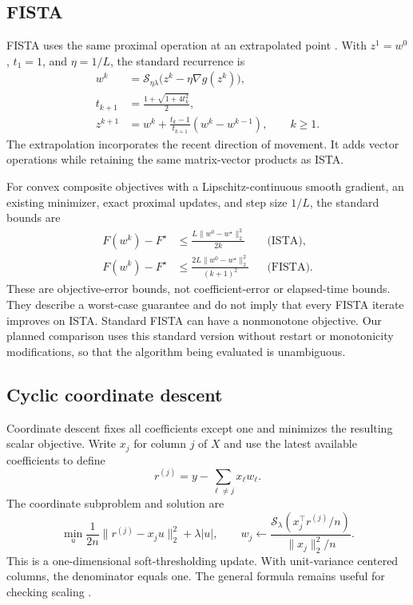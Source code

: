 \documentclass[11pt,a4paper]{article}
\newcommand{\soft}{\mathcal{S}}
\begin{document}
\subsection{FISTA}
FISTA uses the same proximal operation at an extrapolated point \cite{beck2009}. With $z^1=w^0$, $t_1=1$, and $\eta=1/L$, the standard recurrence is
\begin{align}
w^k&=\soft_{\eta\lambda}\bigl(z^k-\eta\nabla g(z^k)\bigr),\\
t_{k+1}&=\frac{1+\sqrt{1+4t_k^2}}{2},\\
z^{k+1}&=w^k+\frac{t_k-1}{t_{k+1}}(w^k-w^{k-1}), \qquad k\geq1.
\end{align}
The extrapolation incorporates the recent direction of movement. It adds vector operations while retaining the same matrix-vector products as ISTA.

For convex composite objectives with a Lipschitz-continuous smooth gradient, an existing minimizer, exact proximal updates, and step size $1/L$, the standard bounds are
\begin{align}
F(w^k)-F^\star&\leq\frac{L\|w^0-w^\star\|_2^2}{2k}
&&\text{(ISTA)},\\
F(w^k)-F^\star&\leq\frac{2L\|w^0-w^\star\|_2^2}{(k+1)^2}
&&\text{(FISTA)}.
\label{eq:rates}
\end{align}
These are objective-error bounds, not coefficient-error or elapsed-time bounds. They describe a worst-case guarantee and do not imply that every FISTA iterate improves on ISTA. Standard FISTA can have a nonmonotone objective. Our planned comparison uses this standard version without restart or monotonicity modifications, so that the algorithm being evaluated is unambiguous.

\subsection{Cyclic coordinate descent}
Coordinate descent fixes all coefficients except one and minimizes the resulting scalar objective. Write $x_j$ for column $j$ of $X$ and use the latest available coefficients to define
\begin{equation}
r^{(j)}=y-\sum_{\ell\ne j}x_\ell w_\ell.
\end{equation}
The coordinate subproblem and solution are
\begin{equation}
\min_u\frac{1}{2n}\|r^{(j)}-x_ju\|_2^2+\lambda|u|,
\qquad
w_j\leftarrow
\frac{\soft_\lambda(x_j^\top r^{(j)}/n)}{\|x_j\|_2^2/n}.
\label{eq:cd}
\end{equation}
This is a one-dimensional soft-thresholding update. With unit-variance centered columns, the denominator equals one. The general formula remains useful for checking scaling \cite{friedman2010}.
\end{document}
